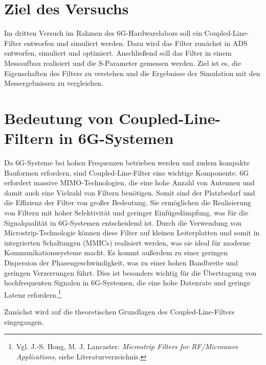 \section{Ziel des Versuchs}
Im dritten Versuch im Rahmen des 6G-Hardwarelabors soll ein Coupled-Line-Filter entworfen und simuliert werden. Dazu wird das Filter zunächst in ADS entworfen, simuliert und optimiert. 
Anschließend soll das Filter in einem Messaufbau realisiert und die S-Parameter gemessen werden. Ziel ist es, die Eigenschaften des Filters zu verstehen und die Ergebnisse der Simulation mit den Messergebnissen zu vergleichen.

\section{Bedeutung von Coupled-Line-Filtern in 6G-Systemen}
Da 6G-Systeme bei hohen Frequenzen betrieben werden und zudem kompakte Bauformen erfordern, sind Coupled-Line-Filter eine wichtige Komponente. 6G erfordert massive MIMO-Technologien, die eine hohe Anzahl von Antennen und damit auch eine Vielzahl von Filtern benötigen.
Somit sind der Platzbedarf und die Effizienz der Filter von großer Bedeutung.
Sie ermöglichen die Realisierung von Filtern mit hoher Selektivität und geringer Einfügedämpfung, was für die Signalqualität in 6G-Systemen entscheidend ist.
Durch die Verwendung von Microstrip-Technologie können diese Filter auf kleinen Leiterplatten und somit in integrierten Schaltungen (MMICs) realisiert werden, was sie ideal für moderne Kommunikationssysteme macht. Es kommt außerdem zu einer geringen Dispersion der Phasengeschwindigkeit, was zu einer hohen Bandbreite und geringen Verzerrungen führt. Dies ist besonders wichtig für die Übertragung von hochfrequenten Signalen in 6G-Systemen, die eine hohe Datenrate und geringe Latenz erfordern.\footnote{Vgl. J.-S. Hong, M. J. Lancaster: \textit{Microstrip Filters for RF/Microwave Applications}, siehe Literaturverzeichnis.}

Zunächst wird auf die theoretischen Grundlagen des Coupled-Line-Filters eingegangen.


\clearpage